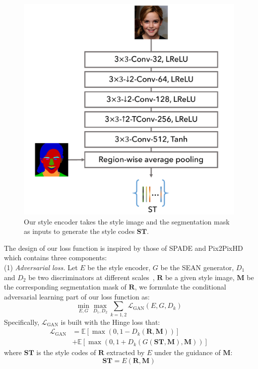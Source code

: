 \documentclass[10pt,twocolumn,letterpaper]{article}
\begin{document}
\begin{figure}[ht]
\centering
\includegraphics[width=0.9\linewidth]{Supp/architecture/supp_style_encoder.pdf}
\caption{Our style encoder takes the style image and the segmentation mask as inputs to generate the style codes $\mathbf{ST}$.}
\label{fig:SEAN style encoder architecture}
\end{figure}


\vspace*{3mm} The design of our loss function is inspired by those of SPADE and Pix2PixHD which contains three components:\\
 
\noindent (1) \textit{Adversarial loss.}
Let $E$ be the style encoder, $G$ be the SEAN generator, $D_1$ and $D_2$ be two discriminators at different scales~\cite{wang2018pix2pixHD}, $\mathbf{R}$ be a given style image, $\mathbf{M}$ be the corresponding segmentation mask of $\mathbf{R}$, we formulate the conditional adversarial learning part of our loss function as:
\small
\begin{equation}
\min _{E, G} \max _{D_{1}, D_{2}} \sum_{k=1,2} \mathcal{L}_{\mathrm{GAN}}\left(E, G, D_{k}\right)
\end{equation}
\normalsize
Specifically, $\mathcal{L}_{\mathrm{GAN}}$ is built with the Hinge loss that:
\small
\begin{equation}
\begin{split}
\mathcal{L}_{\mathrm{GAN}} &= \mathbb{E}\left[\max(0, 1-D_{k}(\mathbf{R, M}))\right] \\
&+  \mathbb{E}\left[\max(0, 1+D_{k}(G\mathbf{\left(\mathbf{ST,M}\right),M}))\right]
\label{eq:adversarial loss function}
\end{split}
\end{equation}
\normalsize
where $\mathbf{ST}$ is the style codes of $\mathbf{R}$ extracted by $E$ under the guidance of $\mathbf{M}$:
\small
\begin{equation}
\mathbf{ST} = E\left(\mathbf{R, M}\right)
\label{eq:ST function}
\end{equation}
\normalsize
\end{document}
